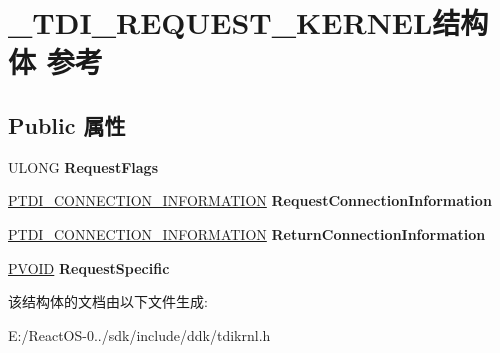 \hypertarget{struct___t_d_i___r_e_q_u_e_s_t___k_e_r_n_e_l}{}\section{\+\_\+\+T\+D\+I\+\_\+\+R\+E\+Q\+U\+E\+S\+T\+\_\+\+K\+E\+R\+N\+E\+L结构体 参考}
\label{struct___t_d_i___r_e_q_u_e_s_t___k_e_r_n_e_l}
\subsection*{Public 属性}
\begin{DoxyCompactItemize}
\item 
\mbox{\label{struct___t_d_i___r_e_q_u_e_s_t___k_e_r_n_e_l_adb2f0b41da4cecc2d9ffada322ac4451}} 
U\+L\+O\+NG {\bfseries Request\+Flags}
\item 
\mbox{\label{struct___t_d_i___r_e_q_u_e_s_t___k_e_r_n_e_l_a9934229de70439102f6060995cf76e6c}} 
\hyperlink{struct___t_d_i___c_o_n_n_e_c_t_i_o_n___i_n_f_o_r_m_a_t_i_o_n}{P\+T\+D\+I\+\_\+\+C\+O\+N\+N\+E\+C\+T\+I\+O\+N\+\_\+\+I\+N\+F\+O\+R\+M\+A\+T\+I\+ON} {\bfseries Request\+Connection\+Information}
\item 
\mbox{\label{struct___t_d_i___r_e_q_u_e_s_t___k_e_r_n_e_l_a9c093e981ca2a21c5614fb2d793eb139}} 
\hyperlink{struct___t_d_i___c_o_n_n_e_c_t_i_o_n___i_n_f_o_r_m_a_t_i_o_n}{P\+T\+D\+I\+\_\+\+C\+O\+N\+N\+E\+C\+T\+I\+O\+N\+\_\+\+I\+N\+F\+O\+R\+M\+A\+T\+I\+ON} {\bfseries Return\+Connection\+Information}
\item 
\mbox{\label{struct___t_d_i___r_e_q_u_e_s_t___k_e_r_n_e_l_a2203212fb3b51a37e1ed5b0c6db6e25b}} 
\hyperlink{interfacevoid}{P\+V\+O\+ID} {\bfseries Request\+Specific}
\end{DoxyCompactItemize}


该结构体的文档由以下文件生成\+:\begin{DoxyCompactItemize}
\item 
E\+:/\+React\+O\+S-\/0../sdk/include/ddk/tdikrnl.\+h\end{DoxyCompactItemize}
